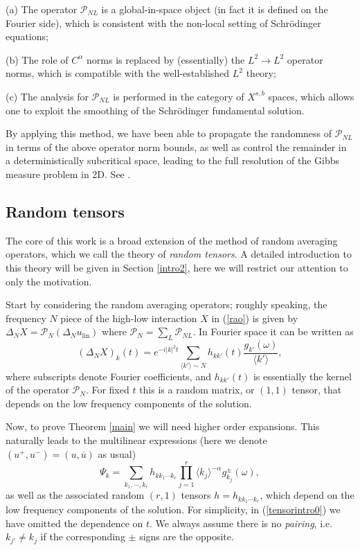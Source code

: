 \documentclass[11 pt,reqno]{amsart}
\theoremstyle{definition}
\theoremstyle{remark}
\numberwithin{equation}{section}
\newcommand{\Pc}{\mathcal{P}}
\begin{document}
(a) The operator $\Pc_{NL}$ is a global-in-space object (in fact it is defined on the Fourier side), which is consistent with the non-local setting of Schr\"{o}dinger equations;

(b) The role of $C^\alpha$ norms is replaced by (essentially) the $L^2\to L^2$ operator norms, which is compatible with the well-established $L^2$ theory;

(c) The analysis for $\Pc_{NL}$ is performed in the category of $X^{s,b}$ spaces, which allows one to exploit the smoothing of the Schr\"{o}dinger fundamental solution.

By applying this method, we have been able to propagate the randomness of $\Pc_{NL}$ in terms of the above operator norm bounds, as well as control the remainder in a deterministically subcritical space, leading to the full resolution of the Gibbs measure problem in 2D. See \cite{DNY}.
 \subsection{Random tensors}\label{randomtensors} The core of this work is a broad extension of the method of random averaging operators, which we call the theory of \emph{random tensors}. A detailed introduction to this theory will be given in Section \ref{intro2}, here we will restrict our attention to only the motivation.
 
  Start by considering the random averaging operators; roughly speaking, the frequency $N$ piece of the high-low interaction $X$ in (\ref{rao}) is given by $\Delta_NX=\Pc_N(\Delta_Nu_\mathrm{lin})$ where $\Pc_N=\sum_L\Pc_{NL}$. In Fourier space it can be written as
 \[(\Delta_NX)_k(t)=e^{-i|k|^2t}\sum_{\langle k'\rangle\sim N}h_{kk'}(t)\frac{g_{k'}(\omega)}{\langle k'\rangle},\] where subscripts denote Fourier coefficients, and $h_{kk'}(t)$ is essentially the kernel of the operator $\Pc_N$. For fixed $t$ this is a random matrix, or $(1,1)$ tensor, that depends on the low frequency components of the solution.
 
 Now, to prove Theorem \ref{main} we will need higher order expansions. This naturally leads to the multilinear expressions (here we denote $(u^+,u^-)=(u,\overline{u})$ as usual)
 \begin{equation}\label{tensorintro0}\Psi_k=\sum_{k_1,\cdots,k_r}h_{kk_1\cdots k_r}\prod_{j=1}^r\langle k_j\rangle^{-\alpha}g_{k_j}^\pm(\omega),\end{equation} as well as the associated random $(r,1)$ tensors $h=h_{kk_1\cdots k_r}$, which depend on the low frequency components of the solution. For simplicity, in (\ref{tensorintro0}) we have omitted the dependence on $t$. We always assume there is no \emph{pairing}, i.e. $k_{j'}\neq k_j$ if the corresponding $\pm$ signs are the opposite.
 
\end{document}

